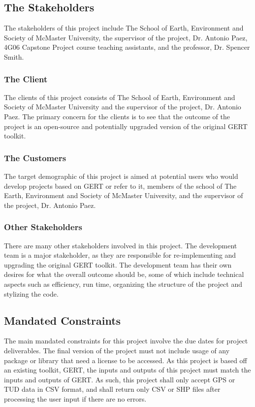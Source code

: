 \documentclass[12pt, titlepage]{article}
\begin{document}
\subsection{The Stakeholders}

The stakeholders of this project include The School of Earth, Environment and Society of McMaster University, the supervisor of the project, Dr. Antonio Paez, 4G06 Capstone Project course teaching assistants, and the professor, Dr. Spencer Smith. 

\subsubsection{The Client}

The clients of this project consists of The School of Earth, Environment and Society of McMaster University and the supervisor of the project, Dr. Antonio Paez. The primary concern for the clients is to see that the outcome of the project is an open-source and potentially upgraded version of the original GERT toolkit.

\subsubsection{The Customers}

The target demographic of this project is aimed at potential users who would develop projects based on GERT or refer to it, members of the school of The Earth, Environment and Society of McMaster University, and the supervisor of the project, Dr. Antonio Paez.

\subsubsection{Other Stakeholders}

There are many other stakeholders involved in this project. The development team is a major stakeholder, as they are responsible for re-implementing and upgrading the original GERT toolkit. The development team has their own desires for what the overall outcome should be, some of which include technical aspects such as efficiency, run time, organizing the structure of the project and  stylizing the code.

\subsection{Mandated Constraints}
The main mandated constraints for this project involve the due dates for project deliverables. The final version of the project must not include usage of any package or library that need a license to be accessed. As this project is based off an existing toolkit, GERT, the inputs and outputs of this project must match the inputs and outputs of GERT. As such, this project shall only accept GPS or TUD data in CSV format, and shall return only CSV or SHP files after processing the user input if there are no errors.
\end{document}
